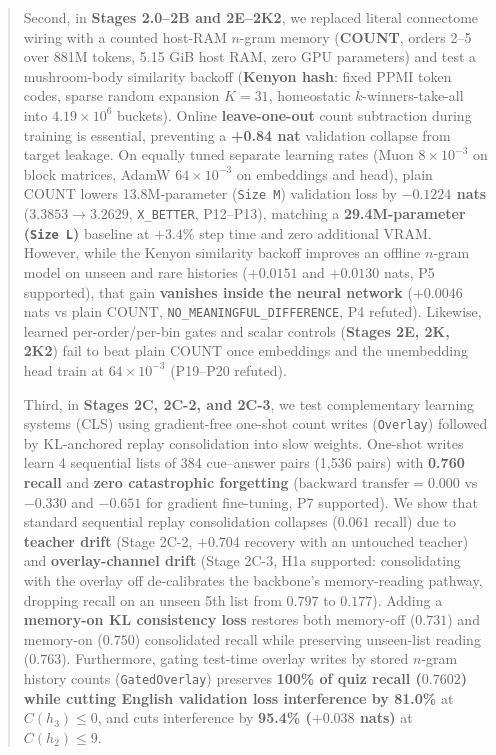 \documentclass[11pt,a4paper]{article}
\begin{document}
\begin{abstract}
Second, in \textbf{Stages 2.0--2B and 2E--2K2}, we replaced literal connectome wiring with a counted host-RAM $n$-gram memory (\textbf{COUNT}, orders 2--5 over 881M tokens, 5.15 GiB host RAM, zero GPU parameters) and test a mushroom-body similarity backoff (\textbf{Kenyon hash}: fixed PPMI token codes, sparse random expansion $K=31$, homeostatic $k$-winners-take-all into $4.19\times 10^6$ buckets). Online \textbf{leave-one-out} count subtraction during training is essential, preventing a \textbf{+0.84 nat} validation collapse from target leakage. On equally tuned separate learning rates (Muon $8\times 10^{-3}$ on block matrices, AdamW $64\times 10^{-3}$ on embeddings and head), plain COUNT lowers 13.8M-parameter (\texttt{Size M}) validation loss by \textbf{$-0.1224$ nats} ($3.3853 \to 3.2629$, \texttt{X\_BETTER}, P12--P13), matching a \textbf{29.4M-parameter (\texttt{Size L})} baseline at $+3.4\%$ step time and zero additional VRAM. However, while the Kenyon similarity backoff improves an offline $n$-gram model on unseen and rare histories ($+0.0151$ and $+0.0130$ nats, P5 supported), that gain \textbf{vanishes inside the neural network} ($+0.0046$ nats vs plain COUNT, \texttt{NO\_MEANINGFUL\_DIFFERENCE}, P4 refuted). Likewise, learned per-order/per-bin gates and scalar controls (\textbf{Stages 2E, 2K, 2K2}) fail to beat plain COUNT once embeddings and the unembedding head train at $64\times 10^{-3}$ (P19--P20 refuted).

Third, in \textbf{Stages 2C, 2C-2, and 2C-3}, we test complementary learning systems (CLS) using gradient-free one-shot count writes (\texttt{Overlay}) followed by KL-anchored replay consolidation into slow weights. One-shot writes learn 4 sequential lists of 384 cue--answer pairs (1,536 pairs) with \textbf{0.760 recall} and \textbf{zero catastrophic forgetting} ($\text{backward transfer} = 0.000$ vs $-0.330$ and $-0.651$ for gradient fine-tuning, P7 supported). We show that standard sequential replay consolidation collapses ($0.061$ recall) due to \textbf{teacher drift} (Stage 2C-2, $+0.704$ recovery with an untouched teacher) and \textbf{overlay-channel drift} (Stage 2C-3, H1a supported: consolidating with the overlay off de-calibrates the backbone's memory-reading pathway, dropping recall on an unseen 5th list from $0.797$ to $0.177$). Adding a \textbf{memory-on KL consistency loss} restores both memory-off ($0.731$) and memory-on ($0.750$) consolidated recall while preserving unseen-list reading ($0.763$). Furthermore, gating test-time overlay writes by stored $n$-gram history counts (\texttt{GatedOverlay}) preserves \textbf{100\% of quiz recall ($0.7602$) while cutting English validation loss interference by 81.0\%} at $C(h_3)\le 0$, and cuts interference by \textbf{95.4\% ($+0.038$ nats)} at $C(h_2)\le 9$.


\end{abstract}
\end{document}
